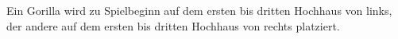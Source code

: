 Ein Gorilla wird zu Spielbeginn auf dem ersten bis dritten Hochhaus von links, der andere auf dem ersten bis dritten Hochhaus von rechts  platziert.
